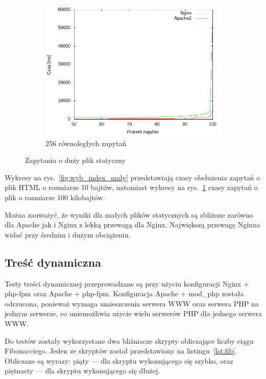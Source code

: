 \begin{figure}
\begin{subfigure}[h]{0.3\textwidth}
		\includegraphics[width=\textwidth]{testy/wybor_index_duzy_256.png}
		\caption{256 równoległych zapytań}
	\end{subfigure}
	\caption{Zapytania o duży plik statyczny}\label{fig:wyb_index_duzy}
\end{figure}
Wykresy na rys.~\ref{fig:wyb_index_maly} przedstawiają czasy obsłużenia zapytań o plik HTML o rozmiarze 10 bajtów, natomiast wykresy na rys.~\ref{fig:wyb_index_duzy} czasy zapytań o plik o rozmiarze 100 kilobajtów.

Można zauważyć, że wyniki dla małych plików statycznych są zbliżone zarówno dla Apache jak i Nginx z lekką przewagą dla Nginx.
Największą przewagę Nginxa widać przy średnim i dużym obciążeniu.
\clearpage
\subsection{Treść dynamiczna}
Testy treści dynamicznej przeprowadzane są przy użyciu konfiguracji Nginx + php-fpm oraz Apache + php-fpm.
Konfiguracja Apache + mod\_php została odrzucona, ponieważ wymaga umieszczenia serwera WWW oraz serwera PHP na jednym serwerze, co uniemożliwia użycie wielu serwerów PHP dla jednego serwera WWW.

Do testów zostały wykorzystane dwa bliźniacze skrypty obliczające liczby ciągu Fibonacciego.
Jeden ze skryptów został przedstawiony na listingu~\ref{lst:fib}.
Obliczane są wyrazy: piąty --- dla skryptu wykonującego się szybko, oraz piętnasty --- dla skryptu wykonującego się dłużej.

